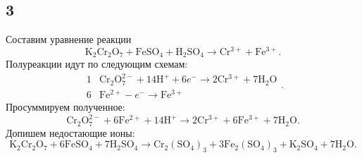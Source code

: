 \subsection{3}

Составим уравнение реакции
\[
\mathrm{K_2Cr_2O_7}+\mathrm{FeSO_4}+\mathrm{H_2SO_4}\longrightarrow\mathrm{Cr^{3+}}+\mathrm{Fe^{3+}}.
\]
Полуреакции идут по следующим схемам:
\[
\begin{array}{r|l}
	1 & \mathrm{Cr_2O_7^{2-}}+14\mathrm{H^+}+6e^-\longrightarrow2\mathrm{Cr^{3+}}+7\mathrm{H_2O} \\
	6 & \mathrm{Fe^{2+}}-e^-\longrightarrow\mathrm{Fe^{3+}}
\end{array}.
\]
Просуммируем полученное:
\[
\mathrm{Cr_2O_7^{2-}}+6\mathrm{Fe^{2+}}+14\mathrm{H^+}\longrightarrow2\mathrm{Cr^{3+}}+6\mathrm{Fe^{3+}}+7\mathrm{H_2O}.
\]
Допишем недостающие ионы:
\[
\mathrm{K_2Cr_2O_7}+6\mathrm{FeSO_4}+7\mathrm{H_2SO_4}\longrightarrow\mathrm{Cr_2(SO_4)_3}+3\mathrm{Fe_2(SO_4)_3}+\mathrm{K_2SO_4}+7\mathrm{H_2O}.
\]